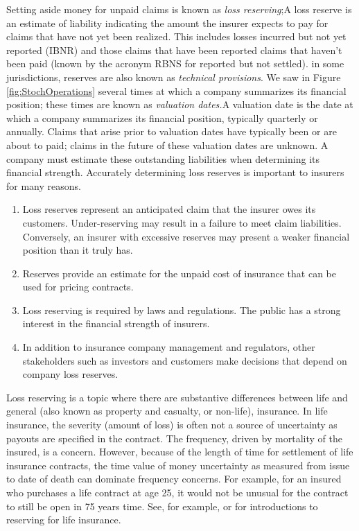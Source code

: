 \documentclass[]{book}
\theoremstyle{definition}
\theoremstyle{definition}
\theoremstyle{definition}
\theoremstyle{remark}
\begin{document}
Setting aside money for unpaid claims is known as \emph{loss
reserving};{A loss reserve is an estimate of liability indicating the
amount the insurer expects to pay for claims that have not yet been
realized. This includes losses incurred but not yet reported (IBNR) and
those claims that have been reported claims that haven't been paid
(known by the acronym RBNS for reported but not settled).} in some
jurisdictions, reserves are also known as \emph{technical provisions}.
We saw in Figure \ref{fig:StochOperations} several times at which a
company summarizes its financial position; these times are known as
\emph{valuation dates.}{A valuation date is the date at which a company
summarizes its financial position, typically quarterly or annually.}
Claims that arise prior to valuation dates have typically been or are
about to paid; claims in the future of these valuation dates are
unknown. A company must estimate these outstanding liabilities when
determining its financial strength. Accurately determining loss reserves
is important to insurers for many reasons.

\begin{enumerate}
\def\labelenumi{\arabic{enumi}.}
\item
  Loss reserves represent an anticipated claim that the insurer owes its
  customers. Under-reserving may result in a failure to meet claim
  liabilities. Conversely, an insurer with excessive reserves may
  present a weaker financial position than it truly has.
\item
  Reserves provide an estimate for the unpaid cost of insurance that can
  be used for pricing contracts.
\item
  Loss reserving is required by laws and regulations. The public has a
  strong interest in the financial strength of insurers.
\item
  In addition to insurance company management and regulators, other
  stakeholders such as investors and customers make decisions that
  depend on company loss reserves.
\end{enumerate}

Loss reserving is a topic where there are substantive differences
between life and general (also known as property and casualty, or
non-life), insurance. In life insurance, the severity (amount of loss)
is often not a source of uncertainty as payouts are specified in the
contract. The frequency, driven by mortality of the insured, is a
concern. However, because of the length of time for settlement of life
insurance contracts, the time value of money uncertainty as measured
from issue to date of death can dominate frequency concerns. For
example, for an insured who purchases a life contract at age 25, it
would not be unusual for the contract to still be open in 75 years time.
See, for example, \citet{bowers1986actuarial} or
\citet{dickson2013actuarial} for introductions to reserving for life
insurance.
\end{document}
